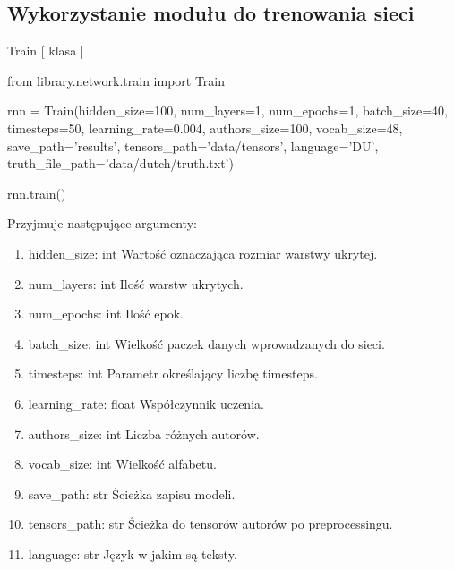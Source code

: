 \newpage
\subsection{Wykorzystanie modułu do trenowania sieci}

\myspace
{}
\myspace

\item {Train [ klasa ] }
\begin{import}
from library.network.train import Train

rnn = Train(hidden_size=100,
            num_layers=1,
            num_epochs=1,
            batch_size=40,
            timesteps=50,
            learning_rate=0.004,
            authors_size=100,
            vocab_size=48,
            save_path='results',
            tensors_path='data/tensors',
            language='DU',
            truth_file_path='data/dutch/truth.txt')
            
rnn.train()
\end{import}

Przyjmuje następujące argumenty:
\begin{enumerate}
	\item hidden\_size: int
		\newline Wartość oznaczająca rozmiar warstwy ukrytej.
	\item num\_layers: int
		\newline Ilość warstw ukrytych.
	\item num\_epochs: int
		\newline Ilość epok.
	\item batch\_size: int
		\newline Wielkość paczek danych wprowadzanych do sieci.
	\item timesteps: int
		\newline Parametr określający liczbę timesteps.
	\item learning\_rate: float
		\newline Współczynnik uczenia.
	\item authors\_size: int
		\newline Liczba różnych autorów.
	\item vocab\_size: int
		\newline Wielkość alfabetu.
	\item save\_path: str
		\newline Ścieżka zapisu modeli.
	\item tensors\_path: str
		\newline Ścieżka do tensorów autorów po preprocessingu.
	\item language: str
		\newline Język w jakim są teksty.
		
\end{enumerate}

